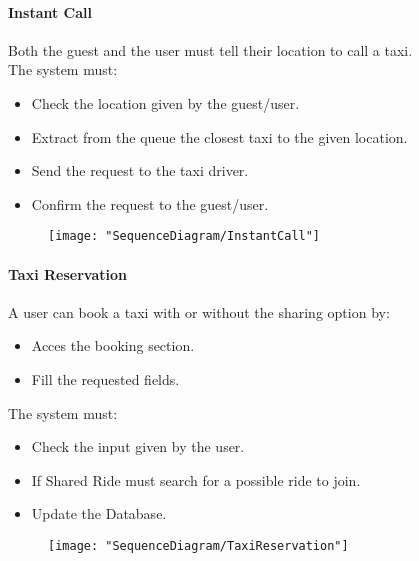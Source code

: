 		\paragraph{Instant Call}
			Both the guest and the user must tell their location to call a taxi.\\
			The system must:\begin{itemize}
				\item Check the location given by the guest/user.
				\item Extract from the queue the closest taxi to the given location.
				\item Send the request to the taxi driver.
				\item Confirm the request to the guest/user.
			\end{itemize}
			\begin{figure}[h!]
				\centering
				\texttt{[image: "SequenceDiagram/InstantCall"]}
			\end{figure}
			\newpage

		\paragraph{Taxi Reservation}
			A user can book a taxi with or without the sharing option by:\begin{itemize}
				\item Acces the booking {section}.
				\item Fill the requested fields.
			\end{itemize}
			The system must:\begin{itemize}
				\item Check the input given by the user.
				\item If Shared Ride must search for a possible ride to join\askpippo.
				\item Update the Database.
			\end{itemize}
			\newpage
			\begin{figure}[h!]
				\centering
				\texttt{[image: "SequenceDiagram/TaxiReservation"]}
			\end{figure}
			\newpage

